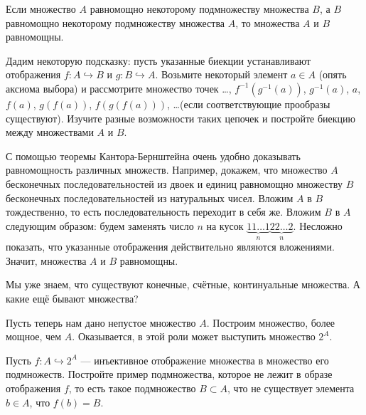 \documentclass[a4paper,12pt]{article}
\begin{document}
Если множество $A$ равномощно некоторому подмножеству множества $B$, а $B$ равномощно некоторому подмножеству множества $A$, то множества $A$ и $B$ равномощны.


Дадим некоторую подсказку: пусть указанные биекции устанавливают отображения $f\colon A\hookrightarrow B$ и $g\colon B\hookrightarrow A$. Возьмите некоторый элемент $a\in A$ (опять аксиома выбора) и рассмотрите множество точек \ldots, $f^{-1}(g^{-1}(a))$, $g^{-1}(a)$, $a$, $f(a)$, $g(f(a))$, $f(g(f(a)))$, \ldots (если соответствующие прообразы  существуют). Изучите разные возможности таких цепочек и постройте биекцию между множествами $A$ и $B$.

С помощью теоремы Кантора-Бернштейна очень удобно доказывать равномощность различных множеств. Например, докажем, что множество $A$ бесконечных последовательностей из двоек и единиц равномощно множеству $B$ бесконечных последовательностей из натуральных чисел. Вложим $A$ в $B$ тождественно, то есть последовательность переходит в себя же. Вложим $B$ в $A$ следующим образом: будем заменять число $n$ на кусок $\underbrace{11\ldots1}_n\underbrace{22\ldots2}_n$. Несложно показать, что указанные отображения действительно являются вложениями. Значит, множества $A$ и $B$ равномощны.

Мы уже знаем, что существуют конечные, счётные, континуальные множества. А какие ещё бывают множества?


Пусть теперь нам дано непустое множество $A$. Построим множество, более мощное, чем $A$. Оказывается, в этой роли может выступить множество $2^A$.

Пусть $f\colon A \hookrightarrow 2^A$ --- инъективное отображение множества в множество его подмножеств.
Постройте пример подмножества, которое не лежит в образе отображения $f$, то есть такое подмножество $B\subset A$, что не существует элемента $b\in A$, что $f(b) = B$.
\end{document}
